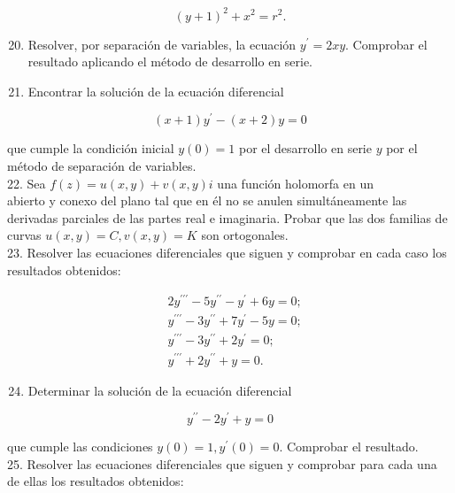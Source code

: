 \documentclass[10pt]{article}
\theoremstyle{plain}
\theoremstyle{definition}
\theoremstyle{remark}
\begin{document}
$$
(y+1)^{2}+x^{2}=r^{2} .
$$

\begin{enumerate}
  \setcounter{enumi}{19}
  \item Resolver, por separación de variables, la ecuación $y^{\prime}=2 x y$. Comprobar el resultado aplicando el método de desarrollo en serie.
  \item Encontrar la solución de la ecuación diferencial
\end{enumerate}

$$
(x+1) y^{\prime}-(x+2) y=0
$$

que cumple la condición inicial $y(0)=1$ por el desarrollo en serie $y$ por el método de separación de variables.\\
22. Sea $f(z)=u(x, y)+v(x, y) i$ una función holomorfa en un\\
abierto y conexo del plano tal que en él no se anulen simultáneamente las derivadas parciales de las partes real e imaginaria. Probar que las dos familias de curvas $u(x, y)=C, v(x, y)=K$ son ortogonales.\\
23. Resolver las ecuaciones diferenciales que siguen y comprobar en cada caso los resultados obtenidos:

$$
\begin{aligned}
& 2 y^{\prime \prime \prime}-5 y^{\prime \prime}-y^{\prime}+6 y=0 ; \\
& y^{\prime \prime \prime}-3 y^{\prime \prime}+7 y^{\prime}-5 y=0 ; \\
& y^{\prime \prime \prime}-3 y^{\prime \prime}+2 y^{\prime}=0 ; \\
& y^{\prime \prime \prime}+2 y^{\prime \prime}+y=0 .
\end{aligned}
$$

\begin{enumerate}
  \setcounter{enumi}{23}
  \item Determinar la solución de la ecuación diferencial
\end{enumerate}

$$
y^{\prime \prime}-2 y^{\prime}+y=0
$$

que cumple las condiciones $y(0)=1, y^{\prime}(0)=0$. Comprobar el resultado.\\
25. Resolver las ecuaciones diferenciales que siguen y comprobar para cada una de ellas los resultados obtenidos:
\end{document}
